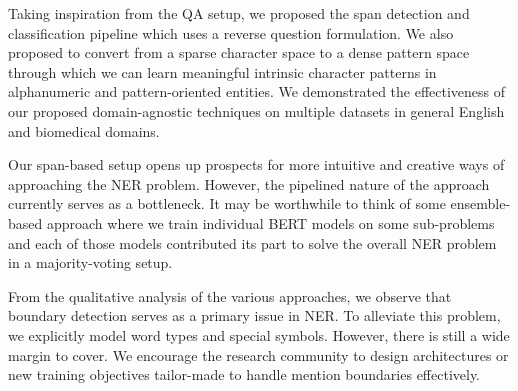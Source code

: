 Taking inspiration from the QA setup, we proposed the span detection and classification pipeline which uses a reverse question formulation. We also proposed to convert from a sparse character space to a dense pattern space through which we can learn meaningful intrinsic character patterns in alphanumeric and pattern-oriented entities. We demonstrated the effectiveness of our proposed domain-agnostic techniques on multiple datasets in general English and biomedical domains. 

Our span-based setup opens up prospects for more intuitive and creative ways of approaching the NER problem. However, the pipelined nature of the approach currently serves as a bottleneck. It may be worthwhile to think of some ensemble-based approach where we train individual BERT models on some sub-problems and each of those models contributed its part to solve the overall NER problem in a majority-voting setup.


From the qualitative analysis of the various approaches, we observe that boundary detection serves as a primary issue in NER. To alleviate this problem, we explicitly model word types and special symbols. However, there is still a wide margin to cover. We encourage the research community to design architectures or new training objectives tailor-made to handle mention boundaries effectively. 
